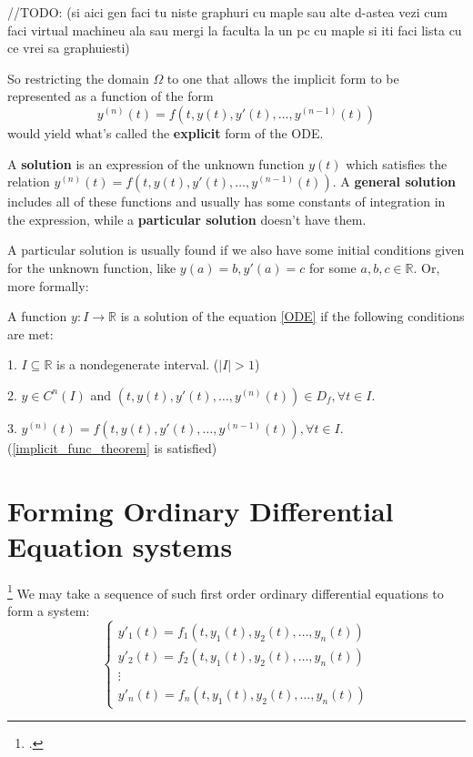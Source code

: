 
\hfill\break
//TODO:
(si aici gen faci tu niste graphuri cu maple sau alte d-astea vezi cum faci virtual machineu ala sau mergi la faculta la un pc cu maple si iti faci lista cu ce vrei sa graphuiesti)
\hfill\break

So restricting the domain $\Omega$ to one that allows the implicit form to be represented as a function of the form
\begin{equation}\label{implicit_func_theorem}
	y^{(n)}(t)=f(t,y(t),y'(t),...,y^{(n-1)}(t))
\end{equation}
would yield what's called the \textbf{explicit} form of the ODE.

A \textbf{solution} is an expression of the unknown function $y(t)$ which satisfies the relation
$y^{(n)}(t) = f(t,y(t),y'(t),\dots,y^{(n-1)}(t))$. A \textbf{general solution} includes all of these functions and usually has some constants of integration in the expression, while a \textbf{particular solution} doesn't have them.

A particular solution is usually found if we also have some initial conditions given for the unknown function, like $y(a)=b, y'(a)=c$ for some $a,b,c \in \mathbb{R}$.
Or, more formally:

\begin{definition}
	A function $y:I \rightarrow \mathbb{R}$ is a solution of the equation \ref{ODE} if the following conditions are met:

	1. $I \subseteq \mathbb{R}$ is a nondegenerate interval. ($|I|>1$)

	2. $y \in C^n(I)$ and $(t,y(t), y'(t), \dots, y^{(n)}(t)) \in D_f, \forall t \in I$.

	3. $y^{(n)}(t)= f(t,y(t),y'(t),\dots,y^{ (n-1) }(t)), \forall t \in I$. (\ref{implicit_func_theorem} is satisfied)

\end{definition}

\section{Forming Ordinary Differential Equation systems}\footcite{Hiroki2015}
We may take a sequence of such first order ordinary differential equations to form a system:
\begin{equation}\label{eq:ode-sys}
	\begin{cases}
		y'_1(t) = f_1(t,y_1(t),y_2(t),\dots,y_n(t)) \\
		y'_2(t) = f_2(t,y_1(t),y_2(t),\dots,y_n(t)) \\
		\vdots                                      \\
		y'_n(t) = f_n(t,y_1(t),y_2(t),\dots,y_n(t))
	\end{cases}
\end{equation}

